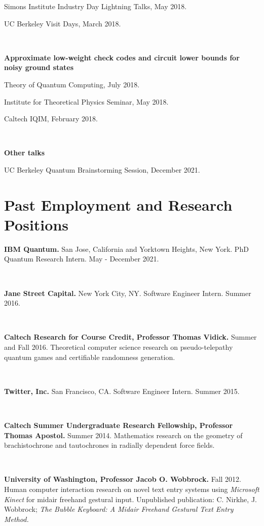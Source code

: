 \documentclass[11pt]{article}
\begin{document}
Simons Institute Industry Day Lightning Talks, May 2018.

UC Berkeley Visit Days, March 2018.

\

\textbf{Approximate low-weight check codes and circuit lower bounds for noisy ground states}

Theory of Quantum Computing, July 2018.

Institute for Theoretical Physics Seminar, May 2018.

Caltech IQIM, February 2018.

\

\textbf{Other talks}

UC Berkeley Quantum Brainstorming Session, December 2021.







\section{Past Employment and Research Positions}

\textbf{IBM Quantum.}
San Jose, California and Yorktown Heights, New York. PhD Quantum Research Intern. May - December 2021.

\

\textbf{Jane Street Capital.}
New York City, NY. Software Engineer Intern. Summer 2016. 

\

\textbf{Caltech Research for Course Credit, Professor Thomas Vidick.}
Summer and Fall 2016. Theoretical computer science research on pseudo-telepathy quantum games and certifiable randomness generation. 

\

\textbf{Twitter, Inc.}
San Francisco, CA. Software Engineer Intern. Summer 2015. 

\	

\textbf{Caltech Summer Undergraduate Research Fellowship, Professor Thomas Apostol.}
Summer 2014. Mathematics research on the geometry of brachistochrone and tautochrones in radially dependent force fields. 

\

\textbf{University of Washington, Professor Jacob O. Wobbrock.}
Fall 2012. Human computer interaction research on novel text entry systems using \emph{Microsoft Kinect} for midair freehand gestural input. Unpublished publication: C. Nirkhe, J. Wobbrock; \emph{The Bubble Keyboard: A Midair Freehand Gestural Text Entry Method.}
\end{document}

